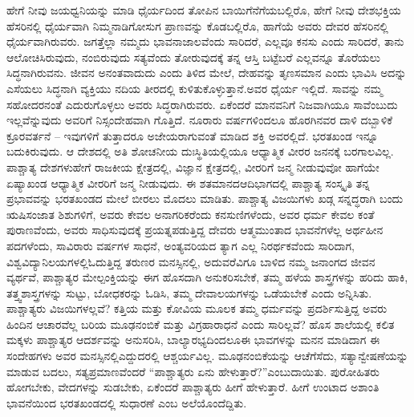 ಹೇಗೆ ನೀವು ಜಯಧ್ವನಿಯನ್ನು ಮಾಡಿ ಧೈರ್ಯದಿಂದ ತೋಪಿನ ಬಾಯಿಗೆ\break ನೆಗೆಯಬಲ್ಲಿರೊ, ಹೇಗೆ ನೀವು ದೇಶಭಕ್ತಿಯ ಹೆಸರಿನಲ್ಲಿ ಧೈರ್ಯವಾಗಿ ನಿಮ್ಮ\break ನಾಡಿಗೋಸುಗ ಪ್ರಾಣವನ್ನು ಕೊಡಬಲ್ಲಿರೊ, ಹಾಗೆಯೆ ಅವರು ದೇವರ ಹೆಸರಿನಲ್ಲಿ ಧೈರ್ಯವಾಗಿರುವರು. ಜಗತ್ತೆಲ್ಲಾ ನಮ್ಮದು ಭಾವನಾಜಾಲವೆಂದು ಸಾರಿದರೆ, ಎಲ್ಲವೂ ಕನಸು ಎಂದು ಸಾರಿದರೆ, ತಾನು ಆಲೋಚಿಸಿರುವುದು, ನಂಬಿರುವುದು ಸತ್ಯವೆಂದು ತೋರುವುದಕ್ಕೆ ತನ್ನ ಆಸ್ತಿ ಬಟ್ಟೆಬರೆ ಎಲ್ಲವನ್ನೂ ತೊರೆಯಲು ಸಿದ್ಧನಾಗಿರುವನು. ಜೀವನ ಅನಂತವಾದುದು ಎಂದು ತಿಳಿದ ಮೇಲೆ, ದೇಹವನ್ನು ತೃಣಸಮಾನ ಎಂದು ಭಾವಿಸಿ ಅದನ್ನು ಎಸೆಯಲು ಸಿದ್ಧನಾಗಿ ವ್ಯಕ್ತಿಯು ನದಿಯ ತೀರದಲ್ಲಿ ಕುಳಿತುಕೊಳ್ಳುತ್ತಾನೆ.\break ಅವರ ಧೈರ್ಯ ಇಲ್ಲಿದೆ. ಸಾವನ್ನು ನಮ್ಮ ಸಹೋದರನಂತೆ ಎದುರುಗೊಳ್ಳಲು ಅವರು ಸಿದ್ಧರಾಗಿರುವರು. ಏಕೆಂದರೆ ಮಾನವನಿಗೆ ನಿಜವಾಗಿಯೂ ಸಾವೆಂಬುದು ಇಲ್ಲವೆನ್ನುವುದು ಅವರಿಗೆ ನಿಸ್ಸಂದೇಹವಾಗಿ ಗೊತ್ತಿದೆ. ನೂರಾರು ವರ್ಷಗಳಿಂದಲೂ ಹೊರಗಿನವರ ದಾಳಿ ದಬ್ಬಾಳಿಕೆ ಕ್ರೂರವರ್ತನೆ – ಇವುಗಳಿಗೆ ತುತ್ತಾದರೂ ಅಜೇಯರಾಗುವಂತೆ ಮಾಡಿದ ಶಕ್ತಿ ಅವರಲ್ಲಿದೆ. ಭರತಖಂಡ ಇನ್ನೂ ಬದುಕಿರುವುದು. ಆ ದೇಶದಲ್ಲಿ ಅತಿ ಶೋಚನೀಯ ದುಃಸ್ಥಿತಿಯಲ್ಲಿಯೂ ಆಧ್ಯಾತ್ಮಿಕ ವೀರರ ಜನನಕ್ಕೆ ಬರಗಾಲವಿಲ್ಲ. ಪಾಶ್ಚಾತ್ಯ ದೇಶಗಳು\break ಹೇಗೆ ರಾಜಕೀಯ ಕ್ಷೇತ್ರದಲ್ಲಿ, ವಿಜ್ಞಾನ ಕ್ಷೇತ್ರದಲ್ಲಿ, ವೀರರಿಗೆ ಜನ್ಮ ನೀಡುವುವೋ ಹಾಗೆಯೇ ಏಷ್ಯಾಖಂಡ ಆಧ್ಯಾತ್ಮಿಕ ವೀರರಿಗೆ ಜನ್ಮ ನೀಡುವುದು. ಈ ಶತಮಾನದ\break ಆದಿಭಾಗದಲ್ಲಿ ಪಾಶ್ಚಾತ್ಯ ಸಂಸ್ಕೃತಿ ತನ್ನ ಪ್ರಭಾವವನ್ನು ಭರತಖಂಡದ ಮೇಲೆ ಬೀರಲು ಮೊದಲು ಮಾಡಿತು. ಪಾಶ್ಚಾತ್ಯ ವಿಜಯಿಗಳು ಖಡ್ಗ ಸನ್ನದ್ಧರಾಗಿ ಬಂದು ಋಷಿಸಂಜಾತ ಶಿಶುಗಳಿಗೆ, ಅವರು ಕೇವಲ ಅನಾಗರಿಕರೆಂದು ಕನಸುಣಿಗಳೆಂದು, ಅವರ ಧರ್ಮ ಕೇವಲ ಕಂತೆ ಪುರಾಣವೆಂದು, ಅವರು ಸಾಧಿಸುವುದಕ್ಕೆ ಪ್ರಯತ್ನಪಡುತ್ತಿದ್ದ ದೇವರು ಆತ್ಮ\break ಮುಂತಾದ ಭಾವನೆಗಳೆಲ್ಲ ಅರ್ಥಹೀನ ಪದಗಳೆಂದು, ಸಾವಿರಾರು ವರ್ಷಗಳ ಸಾಧನೆ, ಅಂತ್ಯವರಿಯದ ತ್ಯಾಗ ಎಲ್ಲ ನಿರರ್ಥಕವೆಂದು ಸಾರಿದಾಗ, ವಿಶ್ವವಿದ್ಯಾನಿಲಯಗಳಲ್ಲಿ\break ಓದುತ್ತಿದ್ದ ತರುಣರ ಮನಸ್ಸಿನಲ್ಲಿ, ಅದುವರೆವಿಗೂ ಬಾಳಿದ ನಮ್ಮ ಜನಾಂಗದ ಜೀವನ ವ್ಯರ್ಥವೆ, ಪಾಶ್ಚಾತ್ಯರ ಮೇಲ್ಪಂಕ್ತಿಯನ್ನು ಈಗ ಹೊಸದಾಗಿ ಅನುಕರಿಸಬೇಕೆ, ತಮ್ಮ ಹಳೆಯ ಶಾಸ್ತ್ರಗಳನ್ನು ಹರಿದು ಹಾಕಿ, ತತ್ತ್ವಶಾಸ್ತ್ರಗಳನ್ನು ಸುಟ್ಟು, ಬೋಧಕರನ್ನು ಓಡಿಸಿ, ತಮ್ಮ ದೇವಾಲಯಗಳನ್ನು ಒಡೆಯಬೇಕೆ ಎಂದು ಅನ್ನಿಸಿತು. ಪಾಶ್ಚಾತ್ಯರು ವಿಜಯಿಗಳಲ್ಲವೆ? ಕತ್ತಿಯ ಮತ್ತು ಕೋವಿಯ ಮೂಲಕ ತಮ್ಮ ಧರ್ಮವನ್ನು ಪ್ರದರ್ಶಿಸುತ್ತಿದ್ದ ಅವರು ಹಿಂದಿನ ಆಚಾರವೆಲ್ಲ ಬರಿಯ ಮೂಢನಂಬಿಕೆ ಮತ್ತು ವಿಗ್ರಹಾರಾಧನೆ ಎಂದು ಸಾರಿಲ್ಲವೆ? ಹೊಸ ಶಾಲೆಯಲ್ಲಿ ಕಲಿತ ಮಕ್ಕಳು ಪಾಶ್ಚಾತ್ಯರ ಆದರ್ಶವನ್ನು ಅನುಸರಿಸಿ, ಬಾಲ್ಯಾರಭ್ಯದಿಂದಲೂ\break ಈ ಭಾವಗಳನ್ನು ಮನನ ಮಾಡಿದಾಗ ಈ ಸಂದೇಹಗಳು ಅವರ ಮನಸ್ಸಿನಲ್ಲಿ\break ಎದ್ದುದರಲ್ಲಿ ಆಶ್ಚರ್ಯವಿಲ್ಲ. ಮೂಢನಂಬಿಕೆಯನ್ನು ಆಚೆಗೆಸೆದು, ಸತ್ಯಾನ್ವೇಷಣೆಯನ್ನು ಮಾಡುವ ಬದಲು, ಸತ್ಯಪ್ರಮಾಣವೆಂದರೆ “ಪಾಶ್ಚಾತ್ಯರು ಏನು ಹೇಳುತ್ತಾರೆ?”\break ಎಂಬುದಾಯಿತು. ಪುರೋಹಿತರು ಹೋಗಬೇಕು, ವೇದಗಳನ್ನು ಸುಡಬೇಕು, ಏಕೆಂದರೆ ಪಾಶ್ಚಾತ್ಯರು ಹೀಗೆ ಹೇಳುತ್ತಾರೆ. ಹೀಗೆ ಉಂಟಾದ ಅಶಾಂತಿ ಭಾವನೆಯಿಂದ ಭರತ\-ಖಂಡದಲ್ಲಿ ಸುಧಾರಣೆ ಎಂಬ ಅಲೆಯೊಂದೆದ್ದಿತು.

